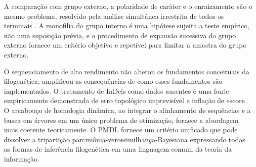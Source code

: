 A comparação com grupo externo, a polaridade de caráter e o enraizamento são o mesmo problema, resolvido pela análise simultânea irrestrita de todos os terminais \parencite{nixon1993}. A monofilia do grupo interno é uma hipótese sujeita a teste empírico, não uma suposição prévia, e o procedimento de expansão sucessiva do grupo externo \parencite{grant2019} fornece um critério objetivo e repetível para limitar a amostra do grupo externo.

O sequenciamento de alto rendimento não alterou os fundamentos conceituais da filogenética; amplificou as consequências de como esses fundamentos são implementados. O tratamento de InDels como dados ausentes é uma fonte empiricamente demonstrada de erro topológico imprevisível e inflação de escore \parencite{jacobmachado2021c}. O arcabouço de homologia dinâmica, ao integrar o alinhamento de sequências e a busca em árvores em um único problema de otimização, fornece a abordagem mais coerente teoricamente. O PMDL \parencite{wheelervaron2025} fornece um critério unificado que pode dissolver a tripartição parcimônia-verossimilhança-Bayesiana expressando todas as formas de inferência filogenética em uma linguagem comum da teoria da informação.

